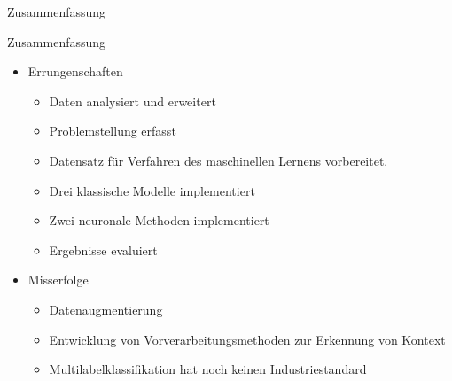 \documentclass[aspectratio=169]{beamer} %
\begin{document}
\begin{frame}{Zusammenfassung}
    \begin{block}{Zusammenfassung}
    \begin{itemize}
    
   
        \item Errungenschaften
        \begin{itemize}
            \item Daten analysiert und erweitert
            \item Problemstellung erfasst            
            \item Datensatz für Verfahren des maschinellen Lernens vorbereitet.
            \item Drei klassische Modelle implementiert
            \item Zwei neuronale Methoden implementiert
            \item Ergebnisse evaluiert
        \end{itemize}
       \item Misserfolge
        \begin{itemize}
            \item Datenaugmentierung
            \item Entwicklung von Vorverarbeitungsmethoden zur Erkennung von Kontext
            \item Multilabelklassifikation hat noch keinen Industriestandard
        
         \end{itemize}
        \end{itemize}
    \end{block}
\end{frame}
\end{document}
